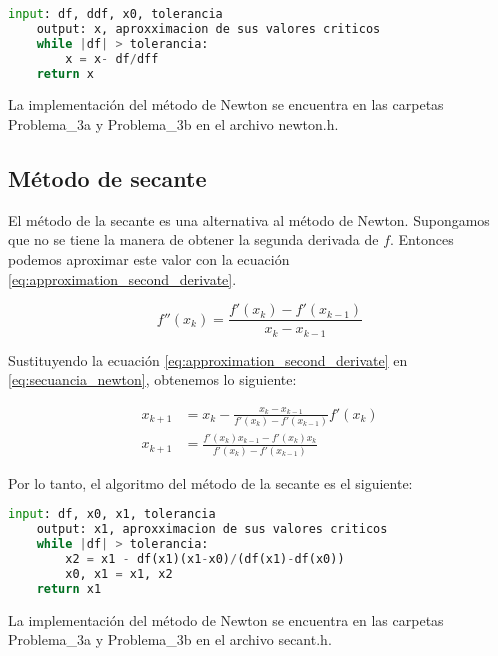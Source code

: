 \begin{lstlisting}[language=python]
    input: df, ddf, x0, tolerancia
    output: x, aproxximacion de sus valores criticos
    while |df| > tolerancia:
        x = x- df/dff
    return x
\end{lstlisting}

La implementación del método de Newton se encuentra en las carpetas \textcolor{citecolor}{Problema\_3a} y \textcolor{citecolor}{Problema\_3b} en el archivo \textcolor{title}{newton.h}.

\subsection*{Método de secante}

El método de la secante es una alternativa al método de Newton. Supongamos que no se tiene la manera de obtener la segunda derivada de $f$. Entonces podemos aproximar este valor con la ecuación \ref{eq:approximation_second_derivate}.

\begin{equation}
    f''(x_k) = \frac{f'(x_k)-f'(x_{k-1})}{x_k-x_{k-1}}
    \label{eq:approximation_second_derivate}
\end{equation}

Sustituyendo la ecuación \ref{eq:approximation_second_derivate} en \ref{eq:secuancia_newton}, obtenemos lo siguiente:

\begin{align}
    x_{k+1} & = x_k - \frac{x_k-x_{k-1}}{f'(x_k)-f'(x_{k-1})} f'(x_k) \nonumber                  \\
    x_{k+1} & = \frac{f'(x_k)x_{k-1}-f'(x_k)x_k}{f'(x_k)-f'(x_{k-1})} \label{eq:sequence_secant}
\end{align}

Por lo tanto, el algoritmo del método de la secante es el siguiente:

\begin{lstlisting}[language=python]
    input: df, x0, x1, tolerancia
    output: x1, aproxximacion de sus valores criticos
    while |df| > tolerancia:
        x2 = x1 - df(x1)(x1-x0)/(df(x1)-df(x0))
        x0, x1 = x1, x2
    return x1
\end{lstlisting}

La implementación del método de Newton se encuentra en las carpetas \textcolor{citecolor}{Problema\_3a} y \textcolor{citecolor}{Problema\_3b} en el archivo \textcolor{title}{secant.h}.